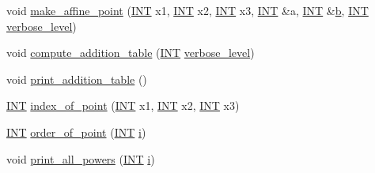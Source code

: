 \begin{DoxyCompactItemize}
\item 
void \mbox{\hyperlink{classelliptic__curve_aab796461061a1041a6b17a9866153544}{make\+\_\+affine\+\_\+point}} (\mbox{\hyperlink{galois_8h_a09fddde158a3a20bd2dcadb609de11dc}{I\+NT}} x1, \mbox{\hyperlink{galois_8h_a09fddde158a3a20bd2dcadb609de11dc}{I\+NT}} x2, \mbox{\hyperlink{galois_8h_a09fddde158a3a20bd2dcadb609de11dc}{I\+NT}} x3, \mbox{\hyperlink{galois_8h_a09fddde158a3a20bd2dcadb609de11dc}{I\+NT}} \&a, \mbox{\hyperlink{galois_8h_a09fddde158a3a20bd2dcadb609de11dc}{I\+NT}} \&\mbox{\hyperlink{classelliptic__curve_ade70b18ed97add66f8811cb584ad1915}{b}}, \mbox{\hyperlink{galois_8h_a09fddde158a3a20bd2dcadb609de11dc}{I\+NT}} \mbox{\hyperlink{simeon_8_c_a818073fbcc2f439e7c56952f67386122}{verbose\+\_\+level}})
\item 
void \mbox{\hyperlink{classelliptic__curve_ac5cc1cd9f3021de56372cc0a0f75b0bd}{compute\+\_\+addition\+\_\+table}} (\mbox{\hyperlink{galois_8h_a09fddde158a3a20bd2dcadb609de11dc}{I\+NT}} \mbox{\hyperlink{simeon_8_c_a818073fbcc2f439e7c56952f67386122}{verbose\+\_\+level}})
\item 
void \mbox{\hyperlink{classelliptic__curve_aee7da611d1ad05db8e6d2d7d797db3fa}{print\+\_\+addition\+\_\+table}} ()
\item 
\mbox{\hyperlink{galois_8h_a09fddde158a3a20bd2dcadb609de11dc}{I\+NT}} \mbox{\hyperlink{classelliptic__curve_a2f85c4e92cae10020fcbba2cd1867405}{index\+\_\+of\+\_\+point}} (\mbox{\hyperlink{galois_8h_a09fddde158a3a20bd2dcadb609de11dc}{I\+NT}} x1, \mbox{\hyperlink{galois_8h_a09fddde158a3a20bd2dcadb609de11dc}{I\+NT}} x2, \mbox{\hyperlink{galois_8h_a09fddde158a3a20bd2dcadb609de11dc}{I\+NT}} x3)
\item 
\mbox{\hyperlink{galois_8h_a09fddde158a3a20bd2dcadb609de11dc}{I\+NT}} \mbox{\hyperlink{classelliptic__curve_a301b1112ceb719ffc59c809747b0d014}{order\+\_\+of\+\_\+point}} (\mbox{\hyperlink{galois_8h_a09fddde158a3a20bd2dcadb609de11dc}{I\+NT}} \mbox{\hyperlink{alphabet2_8_c_acb559820d9ca11295b4500f179ef6392}{i}})
\item 
void \mbox{\hyperlink{classelliptic__curve_ae2f2b3b6f0803419fd576d16a225811c}{print\+\_\+all\+\_\+powers}} (\mbox{\hyperlink{galois_8h_a09fddde158a3a20bd2dcadb609de11dc}{I\+NT}} \mbox{\hyperlink{alphabet2_8_c_acb559820d9ca11295b4500f179ef6392}{i}})
\end{DoxyCompactItemize}
